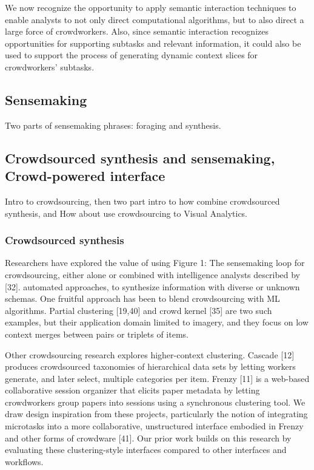 \documentclass[journal]{vgtc}                %
\begin{document}
We now recognize the opportunity to apply semantic interaction techniques to enable analysts to not only direct computational algorithms, but to also direct a large force of crowdworkers.
Also, since semantic interaction recognizes opportunities for supporting subtasks and relevant information, it could also be used to support the process of generating dynamic context slices for crowdworkers’ subtasks.

\subsection{Sensemaking}
Two parts of sensemaking phrases: foraging and synthesis.

\subsection{Crowdsourced synthesis and sensemaking, Crowd-powered interface}
Intro to crowdsourcing, then two part intro to how combine crowdsourced synthesis, and How about use crowdsourcing to Visual Analytics.
\subsubsection{Crowdsourced synthesis}
Researchers have explored the value of using Figure 1: The sensemaking loop for crowdsourcing, either alone or combined with intelligence analysts described by [32]. automated approaches, to synthesize information with diverse or unknown schemas. One fruitful approach has been to blend crowdsourcing with ML algorithms. Partial clustering [19,40] and crowd kernel [35] are two such examples, but their application domain limited to imagery, and they focus on low context merges between pairs or triplets of items.

Other crowdsourcing research explores higher-context clustering. Cascade [12] produces crowdsourced taxonomies of hierarchical data sets by letting workers generate, and later select, multiple categories per item. Frenzy [11] is a web-based collaborative session organizer that elicits paper metadata by letting crowdworkers group papers into sessions using a synchronous clustering tool. We draw design inspiration from these projects, particularly the notion of integrating microtasks into a more collaborative, unstructured interface embodied in Frenzy and other forms of crowdware [41]. Our prior work builds on this research by evaluating these clustering-style interfaces compared to other interfaces and workflows.
\end{document}
